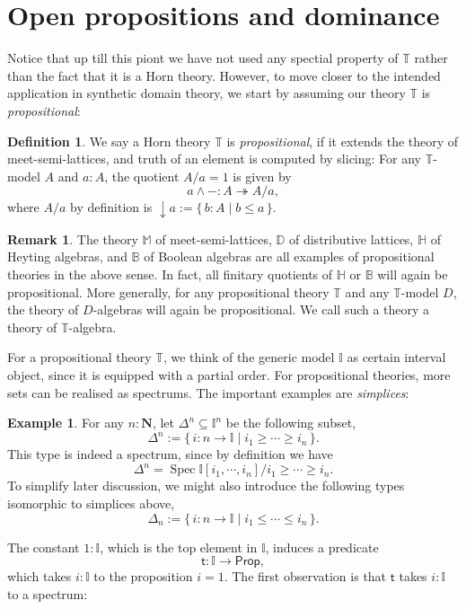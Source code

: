 \documentclass[12pt]{amsart}
\theoremstyle{definition}
\newtheorem{example}[theorem]{Example}
\newtheorem{definition}[theorem]{Definition}
\newtheorem{remark}[theorem]{Remark}
\newcommand{\mb}[1]{\mathbf{#1}}
\newcommand{\mbb}[1]{\mathbb{#1}}
\newcommand{\T}{\mbb T}
\newcommand{\I}{\mbb I}
\newcommand{\ms}[1]{\mathsf{#1}}
\newcommand{\scomp}[2]{\{\,#1\mid#2\,\}}
\newcommand{\surj}{\twoheadrightarrow}
\newcommand{\cv}{\operatorname{\downarrow}}
\newcommand{\N}{\mb N}
\newcommand{\pp}{\ms{Prop}}
\newcommand{\spec}{\operatorname{Spec}}
\begin{document}
\section{Open propositions and dominance}\label{sec:dominance}

Notice that up till this piont we have not used any spectial property of $\T$ rather than the fact that it is a Horn theory. However, to move closer to the intended application in synthetic domain theory, we start by assuming our theory $\T$ is \emph{propositional}: 

\begin{definition}
  We say a Horn theory $\T$ is \emph{propositional}, if it extends the theory of meet-semi-lattices, and truth of an element is computed by slicing: For any $\T$-model $A$ and $a:A$, the quotient $A/a=1$ is given by
  \[ a \wedge - : A \surj A/a, \]
  where $A/a$ by definition is $\cv a := \scomp{b:A}{b\le a}$.
\end{definition}

\begin{remark}
  The theory $\mbb M$ of meet-semi-lattices, $\mbb D$ of distributive lattices, $\mbb H$ of Heyting algebras, and $\mbb B$ of Boolean algebras are all examples of propositional theories in the above sense. In fact, all finitary quotients of $\mbb H$ or $\mbb B$ will again be propositional. More generally, for any propositional theory $\T$ and any $\T$-model $D$, the theory of $D$-algebras will again be propositional. We call such a theory a theory of $\T$-algebra.
\end{remark}

For a propositional theory $\T$, we think of the generic model $\I$ as certain interval object, since it is equipped with a partial order. For propositional theories, more sets can be realised as spectrums. The important examples are \emph{simplices}:

\begin{example}\label{exm:simplicesaffine}
  For any $n : \N$, let $\Delta^n \subseteq \I^n$ be the following subset,
  \[ \Delta^n := \scomp{i : n \to \I}{i_1 \ge \cdots \ge i_n}. \]
  This type is indeed a spectrum, since by definition we have
  \[ \Delta^n = \spec\I[i_1,\cdots,i_n]/i_1\ge\cdots\ge i_n. \]
  To simplify later discussion, we might also introduce the following types isomorphic to simplices above,
  \[ \Delta_n := \scomp{i : n \to \I}{i_1 \le \cdots \le i_n}. \]
\end{example}

The constant $1 : \I$, which is the top element in $\I$, induces a predicate
\[ \ms t : \I \to \pp, \]
which takes $i : \I$ to the proposition $i = 1$. The first observation is that $\ms t$ takes $i : \I$ to a spectrum:
\end{document}

